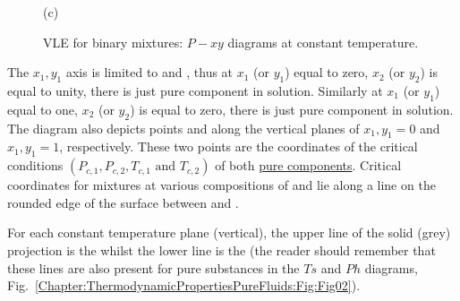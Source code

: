 \begin{figure}[h]
{          \vspace{-.1cm}
          \hbox{\hspace{6.8cm}(c)}}
        \vspace{-.1cm}\caption{VLE for binary mixtures: $P-xy$ diagrams at constant temperature.}\label{Chapter:VLE:Fig:Fig03}
      \end{figure}

The $x_{1},y_{1}$ axis is limited to  and , thus at $x_{1}$ (or $y_{1}$) equal to zero, $x_{2}$ (or $y_{2}$) is equal to unity, \ie there is just pure component  in solution. Similarly at $x_{1}$ (or $y_{1}$) equal to one, $x_{2}$ (or $y_{2}$) is equal to zero, \ie there is just pure component  in solution. The diagram also depicts points  and  along the vertical planes of $x_{1},y_{1}=0$ and $x_{1},y_{1}=1$, respectively. These two points are the coordinates of the critical conditions $\left(P_{c,1}, P_{c,2}, T_{c,1} \text{ and } T_{c,2}\right)$ of both \underline{pure components}. Critical coordinates for mixtures at various compositions of  and  lie along a line on the rounded edge of the surface between  and .

For each constant temperature plane (vertical), the upper line of the solid (grey) projection is the  whilst the lower line is the  (the reader should remember that these lines are also present for pure substances in the $Ts$ and $Ph$ diagrams, Fig.~\ref{Chapter:ThermodynamicPropertiesPureFluids:Fig:Fig02}).


